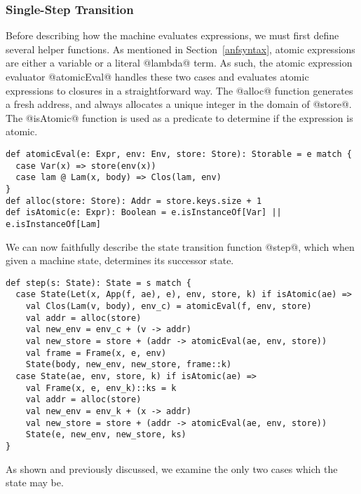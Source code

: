 \documentclass[acmsmall,review,anonymous]{acmart}\settopmatter{printfolios=true,printccs=false,printacmref=false}
\begin{document}
\subsubsection{Single-Step Transition}
Before describing how the machine evaluates expressions, we must first define several helper
functions. As mentioned in Section~\ref{anfsyntax}, atomic expressions are either a variable
or a literal @lambda@ term. As such, the atomic expression evaluator @atomicEval@ handles
these two cases and evaluates atomic expressions to closures in a straightforward way.
The @alloc@ function generates a fresh address, and always allocates a unique integer
in the domain of @store@.
The @isAtomic@ function is used as a predicate to determine if the expression is atomic.

\begin{lstlisting}
def atomicEval(e: Expr, env: Env, store: Store): Storable = e match {
  case Var(x) => store(env(x))
  case lam @ Lam(x, body) => Clos(lam, env)
}
def alloc(store: Store): Addr = store.keys.size + 1
def isAtomic(e: Expr): Boolean = e.isInstanceOf[Var] || e.isInstanceOf[Lam]
\end{lstlisting}

We can now faithfully describe the state transition function @step@,
which when given a machine state, determines its successor state.

\begin{lstlisting}
def step(s: State): State = s match {
  case State(Let(x, App(f, ae), e), env, store, k) if isAtomic(ae) =>
    val Clos(Lam(v, body), env_c) = atomicEval(f, env, store)
    val addr = alloc(store)
    val new_env = env_c + (v -> addr)
    val new_store = store + (addr -> atomicEval(ae, env, store))
    val frame = Frame(x, e, env)
    State(body, new_env, new_store, frame::k)
  case State(ae, env, store, k) if isAtomic(ae) =>
    val Frame(x, e, env_k)::ks = k
    val addr = alloc(store)
    val new_env = env_k + (x -> addr)
    val new_store = store + (addr -> atomicEval(ae, env, store))
    State(e, new_env, new_store, ks)
}
\end{lstlisting}

As shown and previously discussed, we examine the only two cases which the state may be.
\end{document}

